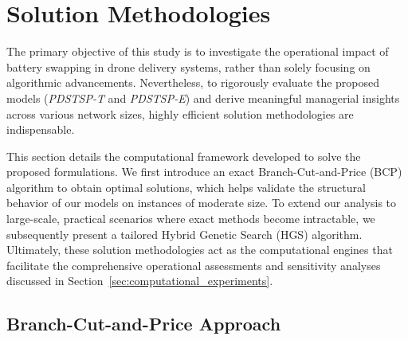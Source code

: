 \documentclass[3p, authoryear, 11pt]{elsarticle}
\begin{document}
\section{Solution Methodologies}
\label{sec:solution_methodologies}

The primary objective of this study is to investigate the operational impact of battery swapping in drone delivery systems, rather than solely focusing on algorithmic advancements. Nevertheless, to rigorously evaluate the proposed models (\textit{PDSTSP-T} and \textit{PDSTSP-E}) and derive meaningful managerial insights across various network sizes, highly efficient solution methodologies are indispensable.

This section details the computational framework developed to solve the proposed formulations. We first introduce an exact Branch-Cut-and-Price (BCP) algorithm to obtain optimal solutions, which helps validate the structural behavior of our models on instances of moderate size. To extend our analysis to large-scale, practical scenarios where exact methods become intractable, we subsequently present a tailored Hybrid Genetic Search (HGS) algorithm. Ultimately, these solution methodologies act as the computational engines that facilitate the comprehensive operational assessments and sensitivity analyses discussed in Section~\ref{sec:computational_experiments}.

\subsection{Branch-Cut-and-Price Approach}
\label{sec:bcp_approach}




\end{document}
